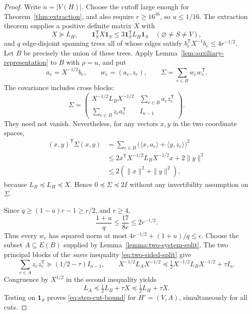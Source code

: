\begin{proof}
Write $n=|V(H)|$. Choose the cutoff large enough for
Theorem~\ref{thm:extraction}, and
also require $r\geq16^{16}$, so $u\leq1/16$.
The extraction theorem supplies a positive definite matrix $X$ with
\[
 X\succeq L_H,
 \qquad
 \mathbf1_S^{\mathsf T}X\mathbf1_S
 \leq3\mathbf1_S^{\mathsf T}L_H\mathbf1_S
 \quad(\varnothing\ne S\ne V),
\]
and $q$ edge-disjoint spanning trees all of whose edges satisfy
$b_e^{\mathsf T}X^{-1}b_e\leq4r^{-1/2}$.
Let $B$ be precisely the union of these trees.  Apply
Lemma~\ref{lem:auxiliary-representation} to $B$ with $\rho=u$, and put
\[
 a_e=X^{-1/2}b_e,\qquad w_e=(a_e,z_e),
 \qquad\Sigma=\sum_{e\in B}w_ew_e^{\mathsf T}.
\]
The covariance includes cross blocks:
\[
 \Sigma=\begin{pmatrix}
 X^{-1/2}L_BX^{-1/2}&\displaystyle\sum_{e\in B}a_ez_e^{\mathsf T}\\
 \displaystyle\sum_{e\in B}z_ea_e^{\mathsf T}&I_{n-1}
 \end{pmatrix}.
\]
They need not vanish.  Nevertheless, for any vectors $x,y$ in the two
coordinate spaces,
\begin{align*}
 (x,y)^{\mathsf T}\Sigma(x,y)
 &=\sum_{e\in B}\bigl(\langle x,a_e\rangle+
                          \langle y,z_e\rangle\bigr)^2\\
 &\leq2x^{\mathsf T}X^{-1/2}L_BX^{-1/2}x+2\|y\|^2\\
 &\leq2(\|x\|^2+\|y\|^2),
\end{align*}
because $L_B\preceq L_H\preceq X$.  Hence
$0\preceq\Sigma\preceq2I$ without any invertibility assumption on
$\Sigma$.

Since $q\geq(1-u)r-1\geq r/2$, and $r\geq4$,
\[
 \frac{1+u}{q}\leq\frac{17}{8r}\leq2r^{-1/2}.
\]
Thus every $w_e$ has squared norm at most
$4r^{-1/2}+(1+u)/q\leq\epsilon$.
Choose the subset $A\subseteq E(B)$ supplied by
Lemma~\ref{lemma:two-system-split}.  The two principal blocks of the
\emph{same} inequality \eqref{eq:two-sided-split} give
\begin{equation}
 \sum_{e\in A}z_ez_e^{\mathsf T}\succeq(1/2-\tau)I_{n-1},
 \qquad
 X^{-1/2}L_AX^{-1/2}
 \preceq\tfrac12X^{-1/2}L_BX^{-1/2}+\tau I_n.
 \label{eq:same-subset-two-constraints}
\end{equation}
Congruence by $X^{1/2}$ in the second inequality yields
\[
 L_A\preceq\tfrac12L_B+\tau X
       \preceq\tfrac12L_H+\tau X.
\]
Testing on $\mathbf1_S$ proves \eqref{eq:step-cut-bound} for
$H'=(V,A)$, simultaneously for all cuts.


\end{proof}
